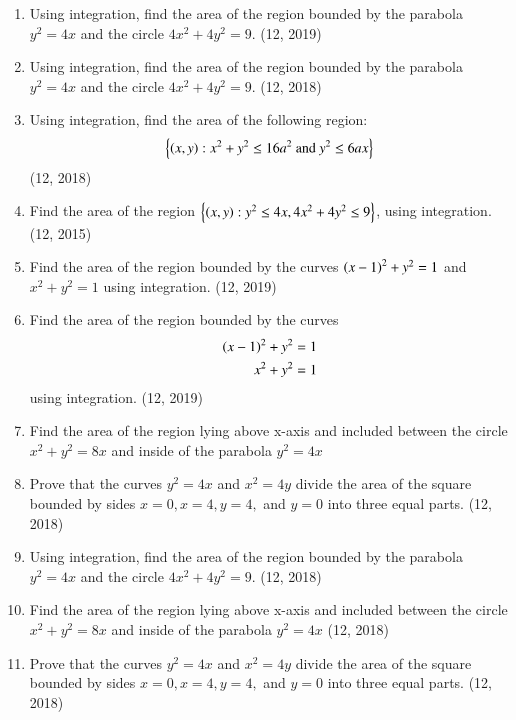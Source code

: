 \begin{enumerate}[label=\thesubsection.\arabic*,ref=\thesubsection.\theenumi]
%
\item Using integration, find the area of the region bounded by the parabola $y^{2}=4x$ and the circle $4x^{2}+4y^{2}=9$. \hfill (12, 2019)
\item Using integration, find the area of the region bounded by the parabola $y^{2}=4x$ and the circle $4x^{2}+4y^{2}=9$. \hfill (12, 2018)
\item Using integration, find the area of the following region:
  \begin{align*}
  \left\{\left(x,y\right):x^{2}+y^{2}\leq 16a^{2} ~\text{and}~ y^{2}\leq 6ax\right\}
  \end{align*}
  \hfill (12, 2018)
\item Find the area of the region $\left\{\left(x,y\right) : y^2 \leq 4x, 4x^2+4y^2 \leq 9\right\}$, using integration.
\hfill (12, 2015)
\item Find the area of the region bounded by the curves $\left(x-1\right)^{2} +y^{2} = 1$ and $ x^{2}+y^{2}  = 1$ using integration.
\hfill (12, 2019)
\item Find the area of the region bounded by the curves  
\begin{align*}
\left(x-1\right)^2 +y^2=1 \\  x^2+y^2=1
\end{align*}
using integration.
\hfill (12, 2019)
\item Find the area of the region lying above x-axis and included between the circle $x^2+y^2 = 8x$ and inside of the parabola $ y^2 = 4x$
\item Prove that the curves $y^2 = 4x$ and $x^2 = 4y$ divide the area of the square bounded by sides $x=0,x=4,y=4,$ and $y=0$ into three equal parts.
\hfill (12, 2018)
\item Using integration, find the area of the region bounded by the parabola $y^{2}=4x$ and the circle $4x^{2}+4y^{2}=9$.
\hfill (12, 2018)
\item Find the area of the region lying above x-axis and included between the circle $x^2+y^2 = 8x$ and inside of the parabola $ y^2 = 4x$
\hfill (12, 2018)
\item Prove that the curves $y^2 = 4x$ and $x^2 = 4y$ divide the area of the square bounded by sides $x=0,x=4,y=4,$ and $y=0$ into three equal parts.
\hfill (12, 2018)

\end{enumerate}
